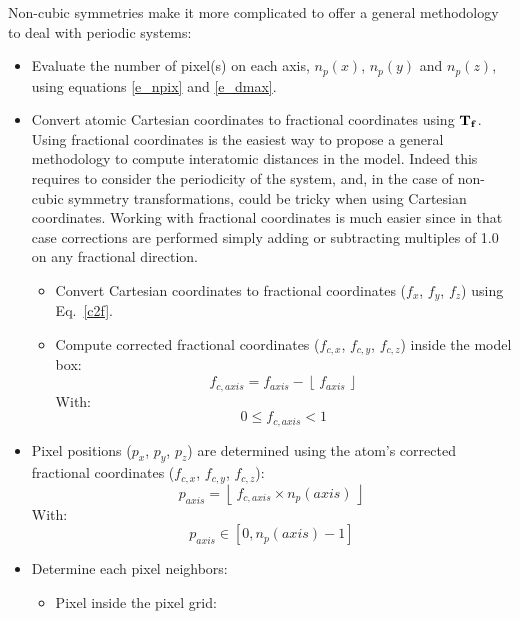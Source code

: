 \documentclass[9pt,tutorial]{livecoms}
\newcommand{\Tf}{{\text{\bf{T}}_{\bf{f}}}}
\begin{document}
Non-cubic symmetries make it more complicated to offer a general methodology to deal with periodic systems:  
\begin{itemize}
\item[1.] Evaluate the number of pixel(s) on each axis, $n_{p}(x)$, $n_{p}(y)$ and $n_{p}(z)$, using equations \ref{e_npix} and \ref{e_dmax}. 
\vspace{0.125cm}
\item[2.] Convert atomic Cartesian coordinates to fractional coordinates using $\Tf$. \\
Using fractional coordinates is the easiest way to propose a general methodology to compute interatomic distances in the model.  
Indeed this requires to consider the periodicity of the system, and, in the case of non-cubic symmetry transformations, could be tricky when using Cartesian coordinates. 
Working with fractional coordinates is much easier since in that case corrections are performed simply adding or subtracting multiples of 1.0 on any fractional direction.
\begin{itemize}
\item Convert Cartesian coordinates to fractional coordinates ($f_{x}$, $f_{y}$, $f_{z}$) using Eq.~\ref{c2f}. 
\item Compute corrected fractional coordinates ($f_{c,x}$, $f_{c,y}$, $f_{c,z}$) inside the model box:
\begin{equation}
f_{c,axis} = f_{axis} - \left\lfloor\ f_{axis}\ \right\rfloor
\end{equation}
With:
\begin{equation}
0 \le f_{c,axis} < 1
\end{equation}
\end{itemize}
\vspace{0.125cm}
\item[3.] Pixel positions ($p_x$, $p_y$, $p_z$) are determined using the atom's corrected fractional coordinates ($f_{c,x}$, $f_{c,y}$, $f_{c,z}$):
\begin{equation}
p_{axis} = \left\lfloor\ f_{c,axis} \times n_{p}(axis)\ \right\rfloor
\end{equation}
With:
\begin{equation}
p_{axis} \in [0, n_{p}(axis)-1]
\end{equation}
\item[4.] Determine each pixel neighbors: 
\begin{itemize}
\item Pixel inside the pixel grid: \\
\begin{center}

\end{center}
\end{itemize}
\end{itemize}
\end{document}
